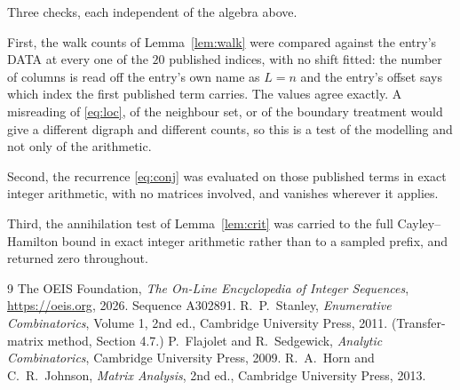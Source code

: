 \documentclass[11pt,a4paper]{article}
\theoremstyle{plain}
\theoremstyle{definition}
\begin{document}
Three checks, each independent of the algebra above.

First, the walk counts of Lemma~\ref{lem:walk} were compared against the entry's DATA at
every one of the $20$ published indices, with no shift fitted: the number of columns is
read off the entry's own name as $L=n$ and the entry's offset says which index the first
published term carries. The values agree exactly. A misreading of \eqref{eq:loc}, of the
neighbour set, or of the boundary treatment would give a different digraph and different
counts, so this is a test of the modelling and not only of the arithmetic.

Second, the recurrence \eqref{eq:conj} was evaluated on those published terms in exact
integer arithmetic, with no matrices involved, and vanishes wherever it applies.

Third, the annihilation test of Lemma~\ref{lem:crit} was carried to the full
Cayley--Hamilton bound in exact integer arithmetic rather than to a sampled prefix, and
returned zero throughout.

\begin{thebibliography}{9}
 The OEIS Foundation, \emph{The On-Line Encyclopedia of Integer
Sequences}, \url{https://oeis.org}, 2026. Sequence A302891.
 R.~P.~Stanley, \emph{Enumerative Combinatorics}, Volume 1, 2nd ed.,
Cambridge University Press, 2011. (Transfer-matrix method, Section 4.7.)
 P.~Flajolet and R.~Sedgewick, \emph{Analytic Combinatorics}, Cambridge
University Press, 2009.
 R.~A.~Horn and C.~R.~Johnson, \emph{Matrix Analysis}, 2nd ed., Cambridge
University Press, 2013.
\end{thebibliography}
\end{document}
